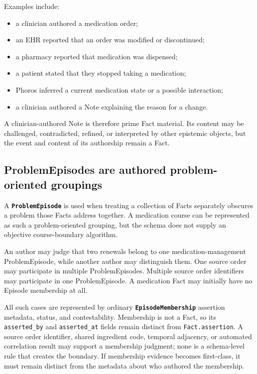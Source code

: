 \documentclass[11pt]{article}
\newcommand{\entity}[1]{\texttt{\textbf{#1}}}
\newcommand{\field}[1]{\texttt{#1}}
\begin{document}
Examples include:

\begin{itemize}[noitemsep]
  \item a clinician authored a medication order;
  \item an EHR reported that an order was modified or discontinued;
  \item a pharmacy reported that medication was dispensed;
  \item a patient stated that they stopped taking a medication;
  \item Phoros inferred a current medication state or a possible interaction;
  \item a clinician authored a Note explaining the reason for a change.
\end{itemize}

A clinician-authored Note is therefore prime Fact material. Its content may be
challenged, contradicted, refined, or interpreted by other epistemic objects,
but the event and content of its authorship remain a Fact.

\subsection{ProblemEpisodes are authored problem-oriented groupings}

A \entity{ProblemEpisode} is used when treating a collection of Facts
separately obscures a problem those Facts address together. A medication
course can be represented as such a problem-oriented grouping, but the schema
does not supply an objective course-boundary algorithm.

An author may judge that two renewals belong to one medication-management
ProblemEpisode, while another author may distinguish them. One source order
may participate in multiple ProblemEpisodes. Multiple source order identifiers
may participate in one ProblemEpisode. A medication Fact may initially have
no Episode membership at all.

All such cases are represented by ordinary \entity{EpisodeMembership}
assertion metadata, status, and contestability. Membership is not a Fact, so
its \field{asserted\_by} and \field{asserted\_at} fields remain distinct from
\field{Fact.assertion}. A source order identifier, shared ingredient code,
temporal adjacency, or automated correlation result may support a membership
judgment; none is a schema-level rule that creates the boundary. If membership
evidence becomes first-class, it must remain distinct from the metadata about
who authored the membership.
\end{document}
